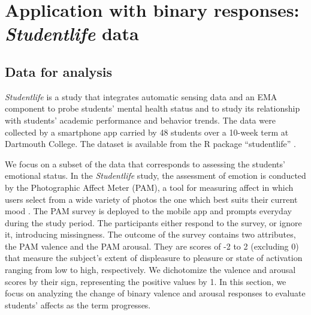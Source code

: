 \section{Application with binary responses: \textit{Studentlife} data}
\label{sec:realapp}



\subsection{Data for analysis}
\label{subsec:datarealapp}


\textit{Studentlife} \citep{StudentLife2014} is a study that integrates automatic 
sensing data and an EMA component to probe students' mental health status and to study 
its relationship with students' academic performance and behavior trends. The data were 
collected by a smartphone app carried by 48 students over a 10-week term at Dartmouth 
College. The dataset %
is available from the R package ``studentlife'' \citep{Studentlifepackage}. 


We focus on a subset of the data that corresponds to assessing the students' emotional status. 
In the \textit{Studentlife} study, the assessment of emotion is conducted by the Photographic 
Affect Meter (PAM), a tool for measuring affect in which users select from a wide variety of 
photos the one which best suits their current mood \citep{Pollak2011}. The PAM survey is 
deployed to the mobile app and prompts everyday during the study period. The participants 
either respond to the survey, or ignore it, introducing missingness. The outcome of the survey 
contains two attributes, the PAM valence and the PAM arousal. They are scores of -2 to 2 
(excluding 0) that measure the subject's extent of displeasure to pleasure or state of 
activation ranging from low to high, respectively. We dichotomize the valence and arousal 
scores by their sign, representing the positive values by 1. In this section, we focus on 
analyzing the change of binary valence and arousal responses to evaluate students' affects 
as the term progresses.    

